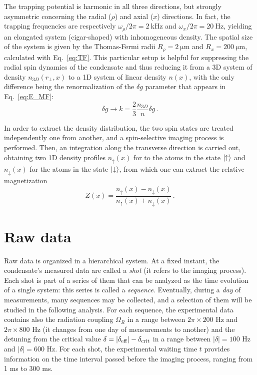 The trapping potential is harmonic in all three directions, but strongly asymmetric concerning the radial ($\rho$) and axial ($x$) directions. In fact, the trapping frequencies are respectively $\omega_\rho/2\pi = 2\ \unit{\kilo\hertz}$ and $\omega_x/2\pi = 20\ \unit{\hertz}$, yielding an elongated system (cigar-shaped) with inhomogeneous density. The spatial size of the system is given by the Thomas-Fermi radii $R_\rho = 2\ \unit{\micro\meter}$ and $R_x = 200\ \unit{\micro\meter}$, calculated with Eq.\ \eqref{eq:TF}. This particular setup is helpful for suppressing the radial spin dynamics of the condensate and thus reducing it from a 3D system of density $n_{3D}(r_\perp,x)$ to a 1D system of linear density $n(x)$, with the only difference being the renormalization of the $\delta g$ parameter that appears in Eq.\ \eqref{eq:E_MF}:
\[
    \delta g \to k = \frac{2}{3}\frac{n_{3D}}{n}\delta g\, .
\]

In order to extract the density distribution, the two spin states are treated independently one from another, and a spin-selective imaging process is performed. Then, an integration along the transverse direction is carried out, obtaining two 1D density profiles $n_\uparrow(x)$ for to the atoms in the state $\ket{\uparrow}$ and $n_\downarrow(x)$ for the atoms in the state $\ket{\downarrow}$, from which one can extract the relative magnetization
\begin{equation}
    Z(x) = \frac{n_\uparrow(x) - n_\downarrow(x)}{n_\uparrow(x) + n_\downarrow(x)}\, .
    \label{eq:magnetization}
\end{equation}

\section{Raw data}
Raw data is organized in a hierarchical system. At a fixed instant, the condensate's measured data are called a \textit{shot} (it refers to the imaging process). Each shot is part of a series of them that can be analyzed as the time evolution of a single system: this series is called a \textit{sequence}. Eventually, during a \textit{day} of measurements, many sequences may be collected, and a selection of them will be studied in the following analysis. For each sequence, the experimental data contains also the radiation coupling $\Omega_R$ in a range between $2\pi \times 200$ \unit{\hertz} and $2\pi \times 800$ \unit{\hertz} (it changes from one day of measurements to another) and the detuning from the critical value $\delta = |\delta_{\rm eff}| - \delta_{\rm crit}$ in a range between $|\delta| = 100$ \unit{\hertz} and $|\delta| = 600$ \unit{\hertz}. For each shot, the experimental waiting time $t$ provides information on the time interval passed before the imaging process, ranging from 1 \unit{\milli\second} to 300 \unit{\milli\second}. 

